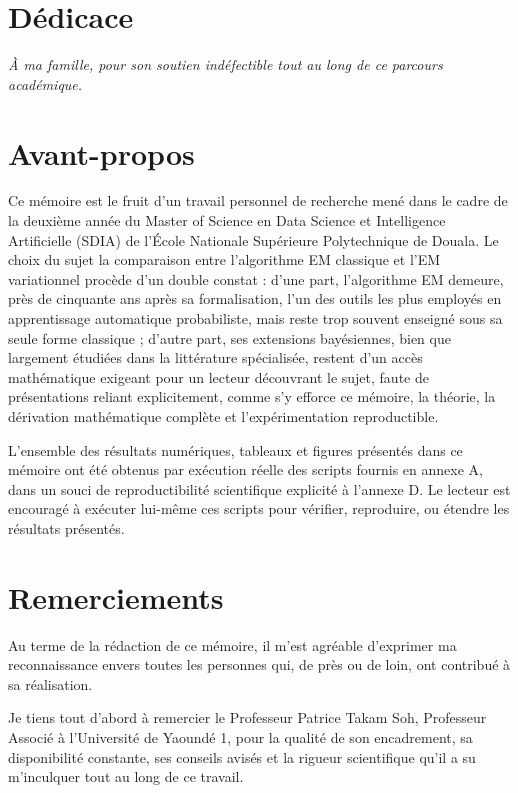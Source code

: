
\chapter*{Dédicace}
\emph{À ma famille, pour son soutien indéfectible tout au long de ce parcours académique.}


\chapter*{Avant-propos}
Ce mémoire est le fruit d'un travail personnel de recherche mené dans le cadre de la deuxième année du Master of Science en Data Science et Intelligence Artificielle (SDIA) de l'École Nationale Supérieure Polytechnique de Douala. Le choix du sujet  la comparaison entre l'algorithme EM classique et l'EM variationnel  procède d'un double constat : d'une part, l'algorithme EM demeure, près de cinquante ans après sa formalisation, l'un des outils les plus employés en apprentissage automatique probabiliste, mais reste trop souvent enseigné sous sa seule forme classique ; d'autre part, ses extensions bayésiennes, bien que largement étudiées dans la littérature spécialisée, restent d'un accès mathématique exigeant pour un lecteur découvrant le sujet, faute de présentations reliant explicitement, comme s'y efforce ce mémoire, la théorie, la dérivation mathématique complète et l'expérimentation reproductible.

L'ensemble des résultats numériques, tableaux et figures présentés dans ce mémoire ont été obtenus par exécution réelle des scripts fournis en annexe A, dans un souci de reproductibilité scientifique explicité à l'annexe D. Le lecteur est encouragé à exécuter lui-même ces scripts pour vérifier, reproduire, ou étendre les résultats présentés.


\chapter*{Remerciements}
Au terme de la rédaction de ce mémoire, il m'est agréable d'exprimer ma reconnaissance envers toutes les personnes qui, de près ou de loin, ont contribué à sa réalisation.

Je tiens tout d'abord à remercier le Professeur Patrice Takam Soh, Professeur Associé à l'Université de Yaoundé 1, pour la qualité de son encadrement, sa disponibilité constante, ses conseils avisés et la rigueur scientifique qu'il a su m'inculquer tout au long de ce travail.

